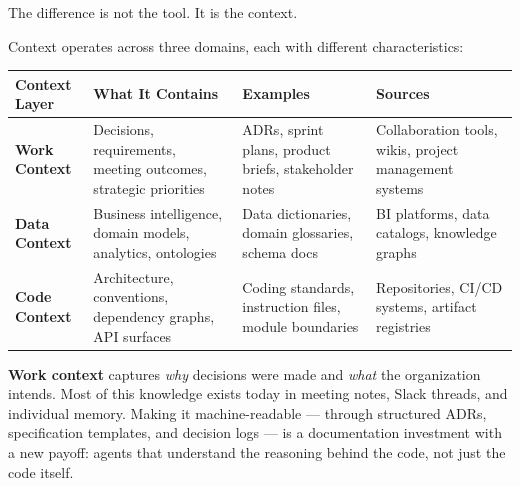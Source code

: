 \documentclass[
  a4paper,
  DIV=11,
  numbers=noendperiod]{scrreprt}
\newcounter{none} %
\begin{document}
The difference is not the tool. It is the context.

Context operates across three domains, each with different
characteristics:

{\def\LTcaptype{none} %
\begin{longtable}[]{@{}
  >{\raggedright\arraybackslash}p{}
  >{\raggedright\arraybackslash}p{}
  >{\raggedright\arraybackslash}p{}
  >{\raggedright\arraybackslash}p{}@{}}
\toprule\noalign{}
\begin{minipage}[b]{\linewidth}\raggedright
Context Layer
\end{minipage} & \begin{minipage}[b]{\linewidth}\raggedright
What It Contains
\end{minipage} & \begin{minipage}[b]{\linewidth}\raggedright
Examples
\end{minipage} & \begin{minipage}[b]{\linewidth}\raggedright
Sources
\end{minipage} \\
\midrule\noalign{}
\endhead
\bottomrule\noalign{}
\endlastfoot
\textbf{Work Context} & Decisions, requirements, meeting outcomes,
strategic priorities & ADRs, sprint plans, product briefs, stakeholder
notes & Collaboration tools, wikis, project management systems \\
\textbf{Data Context} & Business intelligence, domain models, analytics,
ontologies & Data dictionaries, domain glossaries, schema docs & BI
platforms, data catalogs, knowledge graphs \\
\textbf{Code Context} & Architecture, conventions, dependency graphs,
API surfaces & Coding standards, instruction files, module boundaries &
Repositories, CI/CD systems, artifact registries \\
\end{longtable}
}

\textbf{Work context} captures \emph{why} decisions were made and
\emph{what} the organization intends. Most of this knowledge exists
today in meeting notes, Slack threads, and individual memory. Making it
machine-readable --- through structured ADRs, specification templates,
and decision logs --- is a documentation investment with a new payoff:
agents that understand the reasoning behind the code, not just the code
itself.
\end{document}
